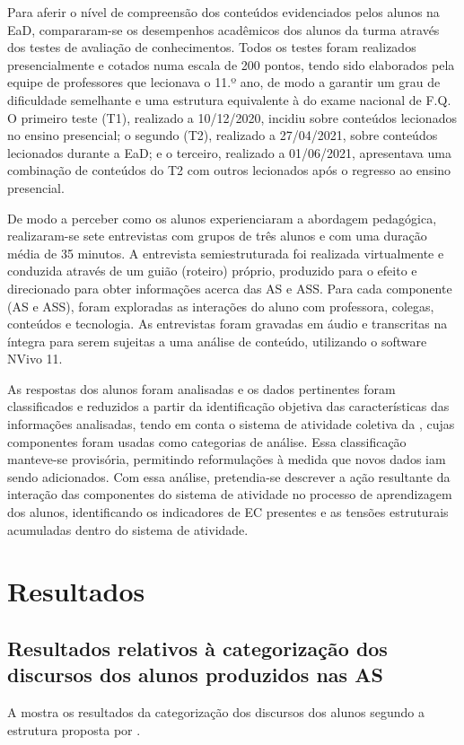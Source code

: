 \documentclass[portuguese]{textolivre}
\begin{document}
Para aferir o nível de compreensão dos conteúdos evidenciados pelos alunos na EaD, compararam-se os desempenhos acadêmicos dos alunos da turma através dos testes de avaliação de conhecimentos. Todos os testes foram realizados presencialmente e cotados numa escala de 200 pontos, tendo sido elaborados pela equipe de professores que lecionava o 11.º ano, de modo a garantir um grau de dificuldade semelhante e uma estrutura equivalente à do exame nacional de F.Q. O primeiro teste (T1), realizado a 10/12/2020, incidiu sobre conteúdos lecionados no ensino presencial; o segundo (T2), realizado a 27/04/2021, sobre conteúdos lecionados durante a EaD; e o terceiro, realizado a 01/06/2021, apresentava uma combinação de conteúdos do T2 com outros lecionados após o regresso ao ensino presencial. 

De modo a perceber como os alunos experienciaram a abordagem pedagógica, realizaram-se sete entrevistas com grupos de três alunos e com uma duração média de 35 minutos. A entrevista semiestruturada foi realizada virtualmente e conduzida através de um guião (roteiro) próprio, produzido para o efeito e direcionado para obter informações acerca das AS e ASS. Para cada componente (AS e ASS), foram exploradas as interações do aluno com professora, colegas, conteúdos e tecnologia. As entrevistas foram gravadas em áudio e transcritas na íntegra para serem sujeitas a uma análise de conteúdo, utilizando o software NVivo 11.

As respostas dos alunos foram analisadas e os dados pertinentes foram classificados e reduzidos a partir da identificação objetiva das características das informações analisadas, tendo em conta o sistema de atividade coletiva da , cujas componentes foram usadas como categorias de análise. Essa classificação manteve-se provisória, permitindo reformulações à medida que novos dados iam sendo adicionados. Com essa análise, pretendia-se descrever a ação resultante da interação das componentes do sistema de atividade no processo de aprendizagem dos alunos, identificando os indicadores de EC presentes e as tensões estruturais acumuladas dentro do sistema de atividade.

\section{Resultados}\label{sec-formato}

\subsection{Resultados relativos à categorização dos discursos dos alunos produzidos nas AS}
A  mostra os resultados da categorização dos discursos dos alunos segundo a estrutura proposta por \textcite{zhu_interaction_2006}.
\end{document}
